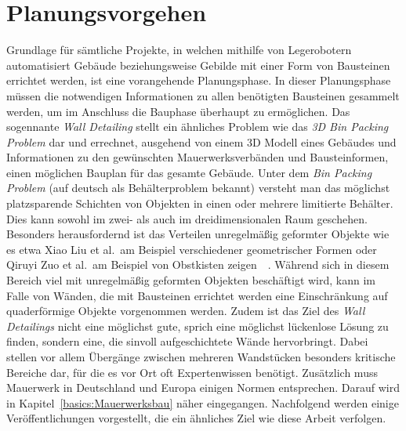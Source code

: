 \section{Planungsvorgehen}
Grundlage für sämtliche Projekte, in welchen mithilfe von Legerobotern automatisiert Gebäude beziehungsweise Gebilde mit einer Form von Bausteinen errichtet werden, ist eine vorangehende Planungsphase.
In dieser Planungsphase müssen die notwendigen Informationen zu allen benötigten Bausteinen gesammelt werden, um im Anschluss die Bauphase überhaupt zu ermöglichen.
Das sogennante \textit{Wall Detailing} stellt ein ähnliches Problem wie das \textit{3D Bin Packing Problem} dar und errechnet, ausgehend von einem 3D Modell eines Gebäudes und Informationen zu den gewünschten Mauerwerksverbänden und Bausteinformen, einen möglichen Bauplan für das gesamte Gebäude.
Unter dem \textit{Bin Packing Problem} (auf deutsch als Behälterproblem bekannt) versteht man das möglichst platzsparende Schichten von Objekten in einen oder mehrere limitierte Behälter.
Dies kann sowohl im zwei- als auch im dreidimensionalen Raum geschehen.
Besonders herausfordernd ist das Verteilen unregelmäßig geformter Objekte wie es etwa Xiao Liu et al.\ am Beispiel verschiedener geometrischer Formen oder Qiruyi Zuo et al.\ am Beispiel von Obstkisten zeigen~\cite{Liu2015}~\cite{Zuo2022}.
Während sich in diesem Bereich viel mit unregelmäßig geformten Objekten beschäftigt wird, kann im Falle von Wänden, die mit Bausteinen errichtet werden eine Einschränkung auf quaderförmige Objekte vorgenommen werden.
Zudem ist das Ziel des \textit{Wall Detailings} nicht eine möglichst gute, sprich eine möglichst lückenlose Lösung zu finden, sondern eine, die sinvoll aufgeschichtete Wände hervorbringt.
Dabei stellen vor allem Übergänge zwischen mehreren Wandstücken besonders kritische Bereiche dar, für die es vor Ort oft Expertenwissen benötigt.
Zusätzlich muss Mauerwerk in Deutschland und Europa einigen Normen entsprechen. 
Darauf wird in Kapitel~\ref{basics:Mauerwerksbau} näher eingegangen.
Nachfolgend werden einige Veröffentlichungen vorgestellt, die ein ähnliches Ziel wie diese Arbeit verfolgen.

